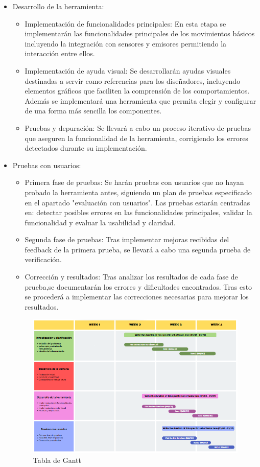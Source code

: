 \begin{itemize}
    \item Desarrollo de la herramienta: 
	\begin{itemize}
	    \item  Implementación de funcionalidades principales: En esta etapa se implementarán las funcionalidades principales de los movimientos básicos incluyendo la integración con sensores y emisores permitiendo la interacción entre ellos.
	    \item Implementación de ayuda visual: Se desarrollarán ayudas visuales destinadas a servir como referencias para los diseñadores, incluyendo elementos gráficos que faciliten la comprensión de los comportamientos. Además se implementará una herramienta que permita elegir y configurar de una forma más sencilla los componentes.
	    \item Pruebas y depuración: Se llevará a cabo un proceso iterativo de pruebas que aseguren la funcionalidad de la herramienta, corrigiendo los errores detectados durante su implementación.
	\end{itemize}
    \item Pruebas con usuarios:
	\begin{itemize}
	    \item Primera fase de pruebas: Se harán pruebas con usuarios que no hayan probado la herramienta antes, siguiendo un plan de pruebas especificado en el apartado "evaluación con usuarios". Las pruebas estarán centradas en: detectar posibles errores en las funcionalidades principales, validar la funcionalidad y evaluar la usabilidad y claridad.
	    \item Segunda fase de pruebas: Tras implementar mejoras recibidas del feedback de la primera prueba, se llevará a cabo una segunda prueba de verificación.
	    \item Corrección y resultados: Tras analizar los resultados de cada fase de prueba,se documentarán los errores y dificultades encontrados. Tras esto se procederá a implementar las correcciones necesarias para mejorar los resultados. 
	\end{itemize}
\begin{figure}[h]
	\centering
	\includegraphics[width = 1\textwidth]{Imagenes/TabladeGantt.png}
	\caption{Tabla de Gantt }
	\label{fig:Tabla de Gantt}
\end{figure}
\end{itemize}
